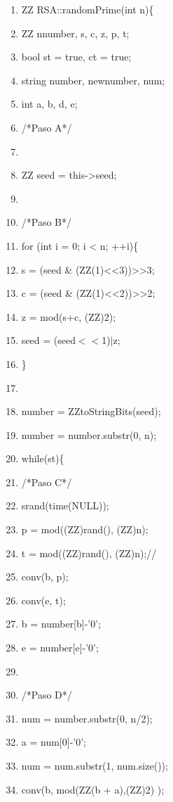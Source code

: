\documentclass[11pt, conference]{IEEEtran}
\begin{document}
\begin{enumerate}
	\item ZZ RSA::randomPrime(int n)\{
	\item \qquad ZZ nnumber, s, c, z, p, t;
	\item \qquad bool st = true, ct = true;
	\item \qquad string number, newnumber, num;
	\item \qquad int a, b, d, e;
	\item \qquad /*Paso A*/
	\item	
	\item \qquad ZZ seed = this->seed;
	\item	  
	\item \qquad /*Paso B*/
	\item \qquad for (int i = 0; i < n; ++i)\{
	\item \qquad\qquad s = (seed \& (ZZ(1)<<3))>>3;
	\item \qquad\qquad c = (seed \& (ZZ(1)<<2))>>2;
	\item \qquad\qquad z = mod(s+c, (ZZ)2);
	\item \qquad\qquad seed = (seed$<<$1)$\mid$z;
	\item \qquad\}
	\item	
	\item \qquad number = ZZtoStringBits(seed);
	\item \qquad number = number.substr(0, n);
	\item \qquad while(st)\{
	\item \qquad\qquad /*Paso C*/
	\item \qquad\qquad srand(time(NULL));
	\item \qquad\qquad p = mod((ZZ)rand(), (ZZ)n);
	\item \qquad\qquad t = mod((ZZ)rand(), (ZZ)n);//
	\item \qquad\qquad conv(b, p);
	\item \qquad\qquad conv(e, t);
	\item \qquad\qquad b = number[b]-'0';
	\item \qquad\qquad e = number[e]-'0';
	\item		
	\item \qquad\qquad /*Paso D*/
	\item \qquad\qquad num = number.substr(0, n/2);
	\item \qquad\qquad a = num[0]-'0';
	\item \qquad\qquad num = num.substr(1, num.size());
	\item \qquad\qquad conv(b, mod(ZZ(b + a),(ZZ)2) );

\end{enumerate}
\end{document}
